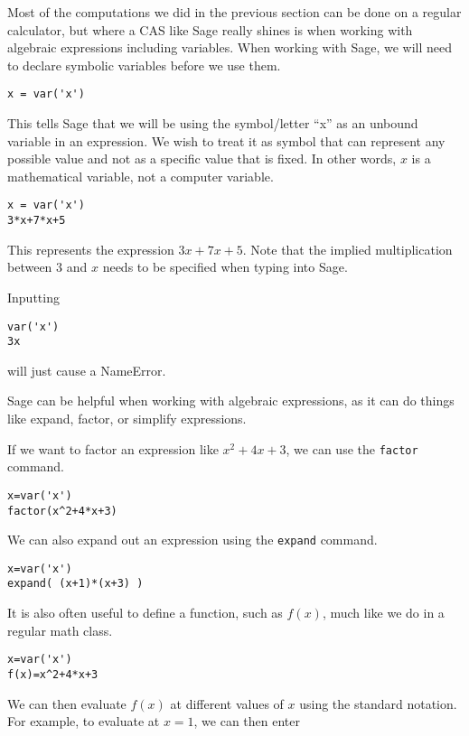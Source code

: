 
Most of the computations we did in the previous section can be
done on a regular calculator, but where a CAS like Sage really
shines is when working with algebraic expressions including
variables. When working with Sage, we will need to declare
symbolic variables before we use them.

\begin{verbatim}
x = var('x')
\end{verbatim}

This tells Sage that we will be using the symbol/letter ``x'' as an
unbound variable in an expression. We wish to treat it as symbol
that can represent any possible value and not as a specific
value that is fixed.  In other words, $x$ is a mathematical variable, not a computer variable.

\begin{verbatim}
x = var('x')
3*x+7*x+5
\end{verbatim}

This represents the expression $3x+7x+5$. Note that the implied
multiplication between $3$ and $x$ needs to be specified when
typing into Sage.

Inputting

\begin{verbatim}
var('x')
3x
\end{verbatim}

\noindent will just cause a NameError.

Sage can be helpful when working with algebraic expressions, as
it can do things like expand, factor, or simplify expressions.

If we want to factor an expression like $x^2+4x+3$, we can use
the  {\tt factor} command.

\begin{verbatim}
x=var('x')
factor(x^2+4*x+3)
\end{verbatim}

We can also expand out an expression using the {\tt expand} command.

\begin{verbatim}
x=var('x')
expand( (x+1)*(x+3) )
\end{verbatim}

It is also often useful to define a function, such as $f(x)$, much like
we do in a regular math class.

\begin{verbatim}
x=var('x')
f(x)=x^2+4*x+3
\end{verbatim}

We can then evaluate $f(x)$ at different values of $x$ using the standard
notation. For example, to evaluate at $x=1$, we can then enter

